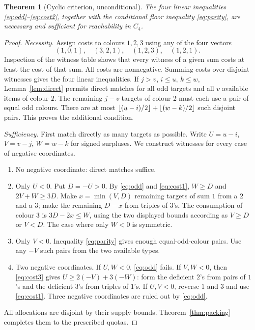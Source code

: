 \documentclass[11pt]{article}
\newtheorem{theorem}{Theorem}[section]
\theoremstyle{remark}\newtheorem{remark}[theorem]{Remark}
\begin{document}
\begin{theorem}[Cyclic criterion, unconditional]\label{thm:cyclic}
The four linear inequalities \eqref{eq:odd}--\eqref{eq:cost2}, together with the conditional floor inequality \eqref{eq:parity}, are necessary and sufficient for reachability in $C_4$.
\end{theorem}
\begin{proof}
\emph{Necessity.} Assign costs to colours $1,2,3$ using any of the four vectors
\[
 (1,0,1),\quad(3,2,1),\quad(1,2,3),\quad(1,2,1).
\]
Inspection of the witness table shows that every witness of a given sum costs at least the cost of that sum. All costs are nonnegative. Summing costs over disjoint witnesses gives the four linear inequalities. If $j>v$, $i\le u$, $k\le w$, Lemma~\ref{lem:direct} permits direct matches for all odd targets and all $v$ available items of colour $2$. The remaining $j-v$ targets of colour $2$ must each use a pair of equal odd colours. There are at most $\left\lfloor (u-i)/2\right\rfloor+\left\lfloor (w-k)/2\right\rfloor$ such disjoint pairs. This proves the additional condition.

\emph{Sufficiency.} First match directly as many targets as possible. Write $U=u-i$, $V=v-j$, $W=w-k$ for signed surpluses. We construct witnesses for every case of negative coordinates.
\begin{enumerate}[label=\textnormal{Case \arabic*.}]
\item No negative coordinate: direct matches suffice.
\item Only $U<0$. Put $D=-U>0$. By \eqref{eq:odd} and \eqref{eq:cost1}, $W\ge D$ and $2V+W\ge3D$. Make $x=\min(V,D)$ remaining targets of sum $1$ from a $2$ and a $3$; make the remaining $D-x$ from triples of $3$'s. The consumption of colour $3$ is $3D-2x\le W$, using the two displayed bounds according as $V\ge D$ or $V<D$. The case where only $W<0$ is symmetric.
\item Only $V<0$. Inequality \eqref{eq:parity} gives enough equal-odd-colour pairs. Use any $-V$ such pairs from the two available types.
\item Two negative coordinates. If $U,W<0$, \eqref{eq:odd} fails. If $V,W<0$, then \eqref{eq:cost3} gives $U\ge 2(-V)+3(-W)$: form the deficient $2$'s from pairs of $1$'s and the deficient $3$'s from triples of $1$'s. If $U,V<0$, reverse $1$ and $3$ and use \eqref{eq:cost1}. Three negative coordinates are ruled out by \eqref{eq:odd}.
\end{enumerate}
All allocations are disjoint by their supply bounds. Theorem~\ref{thm:packing} completes them to the prescribed quotas.
\end{proof}
\end{document}
